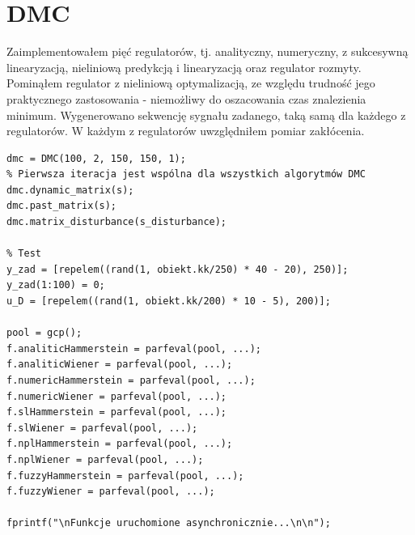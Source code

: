 \chapter{DMC}

Zaimplementowałem pięć regulatorów, tj. analityczny, numeryczny, z sukcesywną linearyzacją, nieliniową predykcją i linearyzacją oraz regulator rozmyty. Pominąłem regulator z nieliniową optymalizacją, ze względu trudność jego praktycznego zastosowania - niemożliwy do oszacowania czas znalezienia minimum. Wygenerowano sekwencję sygnału zadanego, taką samą dla każdego z regulatorów. W każdym z regulatorów uwzględniłem pomiar zakłócenia.

\begin{lstlisting}[style=Matlab-editor]
%% DMC(N, Nu, D, D_disturbance, lambda)
dmc = DMC(100, 2, 150, 150, 1);
% Pierwsza iteracja jest wspólna dla wszystkich algorytmów DMC
dmc.dynamic_matrix(s);
dmc.past_matrix(s);
dmc.matrix_disturbance(s_disturbance);

% Test
y_zad = [repelem((rand(1, obiekt.kk/250) * 40 - 20), 250)];
y_zad(1:100) = 0;
u_D = [repelem((rand(1, obiekt.kk/200) * 10 - 5), 200)];

pool = gcp();
f.analiticHammerstein = parfeval(pool, ...); 
f.analiticWiener = parfeval(pool, ...);
f.numericHammerstein = parfeval(pool, ...);
f.numericWiener = parfeval(pool, ...);
f.slHammerstein = parfeval(pool, ...); 
f.slWiener = parfeval(pool, ...);
f.nplHammerstein = parfeval(pool, ...);
f.nplWiener = parfeval(pool, ...);
f.fuzzyHammerstein = parfeval(pool, ...);
f.fuzzyWiener = parfeval(pool, ...);

fprintf("\nFunkcje uruchomione asynchronicznie...\n\n");
\end{lstlisting}

\newpage
{} 


